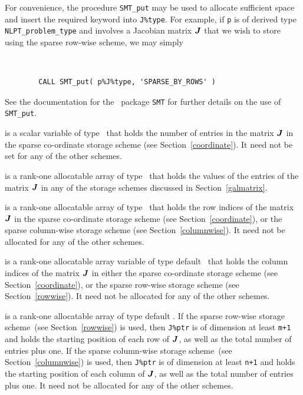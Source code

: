 \documentclass{galahad}
\begin{document}
\begin{description}
\begin{description}
For convenience, the procedure {\tt SMT\_put} may be used to allocate
sufficient space and insert the required keyword into {\tt J\%type}.
For example, if {\tt p} is of derived type {\tt NLPT\_problem\_type}
and involves a Jacobian matrix ${\bm{J}}$ that we wish to store using
the sparse row-wise scheme, we may simply
{\tt 
\begin{verbatim}
        CALL SMT_put( p%J%type, 'SPARSE_BY_ROWS' )
\end{verbatim}
}
\noindent
See the documentation for the \galahad\ package {\tt SMT} 
for further details on the use of {\tt SMT\_put}.

 is a scalar variable of type \integer\ that holds
the number of entries in the matrix ${\bm{J}}$ in the sparse co-ordinate
storage scheme (see Section~\ref{coordinate}).  It need not be set for
any of the other schemes.

 is a rank-one allocatable array of type \realdp\ that holds
the values of the entries of the matrix ${\bm{J}}$ in any of the 
storage schemes discussed in Section~\ref{galmatrix}.

 is a rank-one allocatable array of type \integer\
that holds the row indices of the matrix ${\bm{J}}$ in the sparse
co-ordinate storage scheme (see Section~\ref{coordinate}), or the
sparse column-wise storage scheme (see Section~\ref{columnwise}).  It
need not be allocated for any of the other schemes.

 is a rank-one allocatable array variable of type default
\integer\ that holds the column indices of the matrix ${\bm{J}}$ in
either the sparse co-ordinate storage scheme (see Section~\ref{coordinate}), or the
sparse row-wise storage scheme (see Section~\ref{rowwise}).  It need
not be allocated for any of the other schemes.

 is a rank-one allocatable array of type default
\integer.  If the sparse row-wise storage scheme~(see Section~\ref{rowwise})
is used, then {\tt J\%ptr} is of dimension at least {\tt m+1} and holds the
starting position of each row of ${\bm{J}}$, as well as the total number
of entries plus one.  If the sparse column-wise storage scheme~(see
Section~\ref{columnwise}) is used, then {\tt J\%ptr} is of dimension
at least {\tt n+1} and holds the starting position of each column of ${\bm{J}}$, as well as
the total number of entries plus one.  It need not be allocated for
any of the other schemes.


\end{description}
\end{description}
\end{document}
